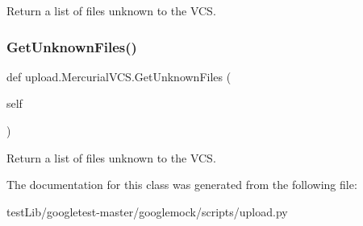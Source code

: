 \begin{DoxyVerb}Return a list of files unknown to the VCS.\end{DoxyVerb}
 \mbox{\label{classupload_1_1MercurialVCS_a6190899fb86cd09ad84cc5d4b0ebd2f3}} 
\subsubsection{\texorpdfstring{Get\+Unknown\+Files()}{GetUnknownFiles()}\hspace{0.1cm}{\footnotesize\ttfamily [2/2]}}
{\footnotesize\ttfamily def upload.\+Mercurial\+V\+C\+S.\+Get\+Unknown\+Files (\begin{DoxyParamCaption}\item[{}]{self }\end{DoxyParamCaption})}

\begin{DoxyVerb}Return a list of files unknown to the VCS.\end{DoxyVerb}
 

The documentation for this class was generated from the following file\+:\begin{DoxyCompactItemize}
\item 
test\+Lib/googletest-\/master/googlemock/scripts/upload.\+py\end{DoxyCompactItemize}
